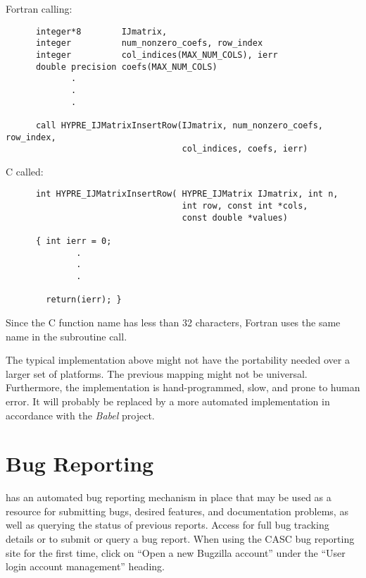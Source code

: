   Fortran calling:
\begin{verbatim}
      integer*8        IJmatrix, 
      integer          num_nonzero_coefs, row_index
      integer          col_indices(MAX_NUM_COLS), ierr
      double precision coefs(MAX_NUM_COLS)
             .
             .
             .

      call HYPRE_IJMatrixInsertRow(IJmatrix, num_nonzero_coefs, row_index,
                                   col_indices, coefs, ierr)
\end{verbatim}

\vspace{0.1in}

  C called:
\begin{verbatim}
      int HYPRE_IJMatrixInsertRow( HYPRE_IJMatrix IJmatrix, int n,
                                   int row, const int *cols,
                                   const double *values)     

      { int ierr = 0;
              .
              .
              .

        return(ierr); }
\end{verbatim}

\noindent Since the C function name has less than 32 characters, Fortran
uses the same name in the subroutine call.

The typical implementation above might not have the portability needed
over a larger set of platforms.  The previous mapping might
not be universal.  Furthermore,
the implementation is hand-programmed, slow, and prone to human error.
It will probably be replaced by a more automated implementation in accordance
with the {\sl Babel} project. 


\section{Bug Reporting}

\hypre{} has an automated bug reporting mechanism in place that may be used 
as a resource for submitting bugs, desired features, and documentation
problems, as well as querying the status of previous reports.  Access
for full bug tracking details or to submit or query a bug report.
When using the CASC bug reporting site for the first time, click on
``Open a new Bugzilla account'' under the ``User login account
management'' heading.

